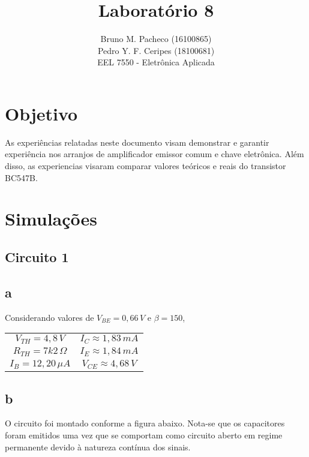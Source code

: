 \documentclass[a4paper]{report}
\begin{document}
 
\title{Laboratório 8}
\author{Bruno M. Pacheco (16100865)\\
Pedro Y. F. Ceripes (18100681) \\
EEL 7550 - Eletrônica Aplicada}

\maketitle
\section*{Objetivo}

As experiências relatadas neste documento visam demonstrar e garantir experiência nos arranjos de amplificador emissor comum e chave eletrônica. Além disso, as experiencias visaram comparar valores teóricos e reais do transistor BC547B.

\section*{Simulações}

\subsection*{Circuito 1}
\subsection*{a}

Considerando valores de $V_{BE} = 0,66\,V$ e $\beta = 150$,

\begin{table}[H]
    \centering
    \begin{tabular}{c c}
    $V_{TH} = 4,8\,V$ & $I_C \approx 1,83\,mA$ \\
    $R_{TH} = 7k2\,\Omega$ & $I_E \approx 1,84\, mA $ \\
    $I_B = 12,20\,\mu A$ & $V_{CE} \approx 4,68\,V$
    \end{tabular}
\end{table}

\subsection*{b}

O circuito foi montado conforme a figura abaixo. Nota-se que os capacitores foram emitidos uma vez que se comportam como circuito aberto em regime permanente devido à natureza contínua dos sinais.
\end{document}
